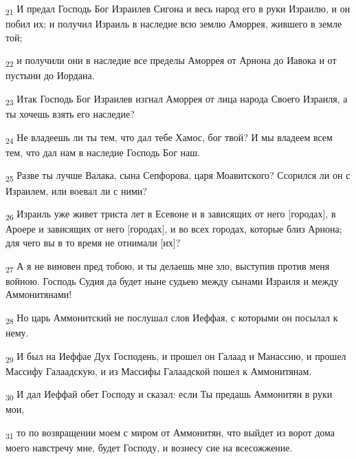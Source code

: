 \begin{tcolorbox}
\textsubscript{21} И предал Господь Бог Израилев Сигона и весь народ его в руки Израилю, и он побил их; и получил Израиль в наследие всю землю Аморрея, жившего в земле той;
\end{tcolorbox}
\begin{tcolorbox}
\textsubscript{22} и получили они в наследие все пределы Аморрея от Арнона до Иавока и от пустыни до Иордана.
\end{tcolorbox}
\begin{tcolorbox}
\textsubscript{23} Итак Господь Бог Израилев изгнал Аморрея от лица народа Своего Израиля, а ты хочешь взять его наследие?
\end{tcolorbox}
\begin{tcolorbox}
\textsubscript{24} Не владеешь ли ты тем, что дал тебе Хамос, бог твой? И мы владеем всем тем, что дал нам в наследие Господь Бог наш.
\end{tcolorbox}
\begin{tcolorbox}
\textsubscript{25} Разве ты лучше Валака, сына Сепфорова, царя Моавитского? Ссорился ли он с Израилем, или воевал ли с ними?
\end{tcolorbox}
\begin{tcolorbox}
\textsubscript{26} Израиль уже живет триста лет в Есевоне и в зависящих от него [городах], в Ароере и зависящих от него [городах], и во всех городах, которые близ Арнона; для чего вы в то время не отнимали [их]?
\end{tcolorbox}
\begin{tcolorbox}
\textsubscript{27} А я не виновен пред тобою, и ты делаешь мне зло, выступив против меня войною. Господь Судия да будет ныне судьею между сынами Израиля и между Аммонитянами!
\end{tcolorbox}
\begin{tcolorbox}
\textsubscript{28} Но царь Аммонитский не послушал слов Иеффая, с которыми он посылал к нему.
\end{tcolorbox}
\begin{tcolorbox}
\textsubscript{29} И был на Иеффае Дух Господень, и прошел он Галаад и Манассию, и прошел Массифу Галаадскую, и из Массифы Галаадской пошел к Аммонитянам.
\end{tcolorbox}
\begin{tcolorbox}
\textsubscript{30} И дал Иеффай обет Господу и сказал: если Ты предашь Аммонитян в руки мои,
\end{tcolorbox}
\begin{tcolorbox}
\textsubscript{31} то по возвращении моем с миром от Аммонитян, что выйдет из ворот дома моего навстречу мне, будет Господу, и вознесу сие на всесожжение.
\end{tcolorbox}
